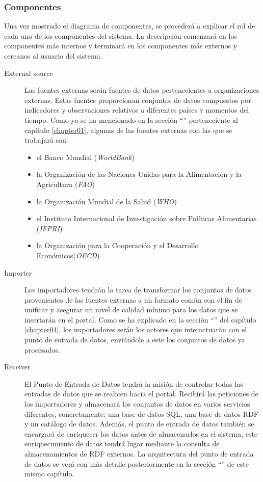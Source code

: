 \subsubsection{Componentes}
Una vez mostrado el diagrama de componentes, se procederá a explicar el rol de cada uno de los componentes del sistema.  La descripción comenzará en los componentes más internos y terminará en los componentes más externos y cercanos al usuario del sistema.
\begin{description}
	\item[External source]  Las fuentes externas  serán fuentes de datos pertenecientes a organizaciones externas.  Estas fuentes proporcionan conjuntos de datos compuestos por indicadores y observaciones relativos a diferentes países y momentos del tiempo.  Como ya se ha mencionado en la sección ``'' perteneciente al capítulo \ref{chapter01}, algunas de las fuentes externas con las que se trabajará son:
	\begin{itemize}
		\item el Banco Mundial (\textit{WorldBank})
		\item la Organización de las Naciones Unidas para la Alimentación y la Agricultura (\textit{FAO})
		\item la Organización Mundial de la Salud (\textit{WHO})
		\item el Instituto Internacional de Investigación sobre Políticas Alimentarias (\textit{IFPRI})
		\item la Organización para la Cooperación y el Desarrollo Económicos(\textit{OECD})
	\end{itemize}
	\item[Importer]  Los importadores  tendrán la tarea de transformar los conjuntos de datos provenientes de las fuentes externas a un formato común con el fin de unificar y asegurar un nivel de calidad mínimo para los datos que se insertarán en el portal.  Como se ha explicado en la sección ``'' del capítulo \ref{chapter04}, los importadores serán los actores que interactuarán con el punto de entrada de datos, enviándole a este los conjuntos de datos ya procesados.
	\item[Receiver]  El Punto de Entrada de Datos  tendrá la misión de controlar todas las entradas de datos que se realicen hacia el portal.  Recibirá las peticiones de los importadores y almacenará los conjuntos de datos en varios servicios diferentes, concretamente: una base de datos SQL, una base de datos RDF y un catálogo de datos.  Además, el punto de entrada de datos también se encargará de enriquecer los datos antes de almacenarlos en el sistema, este enriquecimiento de datos tendrá lugar mediante la consulta de almacenamientos de RDF externos.  La arquitectura del punto de entrada de datos se verá con más detalle posteriormente en la sección ``'' de este mismo capítulo.

\end{description}
